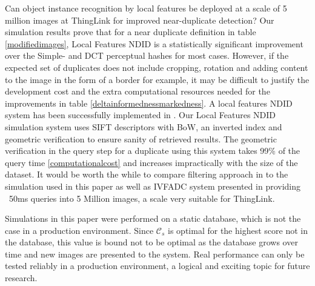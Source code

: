 \documentclass[english,12pt,a4paper,pdftex,elec,utf8, table]{aaltothesis}
\begin{document}
Can object instance recognition by local features be deployed at a scale of 5 million images at ThingLink for improved near-duplicate detection? Our simulation results prove that for a near duplicate definition in table \ref{modifiedimages}, Local Features NDID is a statistically significant improvement over the Simple- and DCT perceptual hashes for most cases. However, if the expected set of duplicates does not include cropping, rotation and adding content to the image in the form of a border for example, it may be difficult to justify the development cost and the extra computational resources needed for the improvements in table \ref{deltainformednessmarkedness}. A local features NDID system has been successfully implemented in \cite{dong2012high}. Our Local Features NDID simulation system uses SIFT descriptors with BoW, an inverted index and geometric verification to ensure sanity of retrieved results. The geometric verification in the query step for a duplicate using this system takes 99\% of the query time \ref{computationalcost} and increases impractically with the size of the dataset. It would be worth the while to compare filtering approach in \cite{dong2012high} to the simulation used in this paper as well as IVFADC system presented in \cite{Jegou2010} providing ~50ms queries into 5 Million images, a scale very suitable for ThingLink.

Simulations in this paper were performed on a static database, which is not the case in a production environment. Since $\mathcal{C}_s$ is optimal for the highest score not in the database, this value is bound not to be optimal as the database grows over time and new images are presented to the system. Real performance can only be tested reliably in a production environment, a logical and exciting topic for future research.

\clearpage


{}

{}
\end{document}
